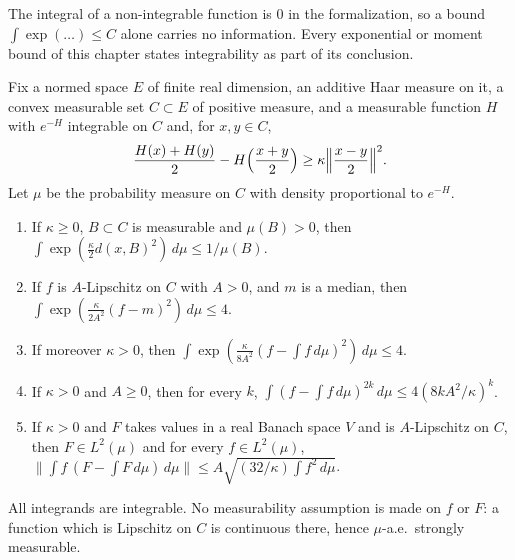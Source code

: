 \begin{remark}\label{rem:sg-tal:st-integrability}
The integral of a non-integrable function is $0$ in the formalization, so a bound
$\int\exp(\ldots)\le C$ alone carries no information. Every exponential or moment bound of this chapter
states integrability as part of its conclusion.
\end{remark}

\begin{theorem}\label{thm:sg-tal:st-maurey}
  \leanok
Fix a normed space $E$ of finite real dimension, an additive Haar measure on it, a convex measurable
set $C\subset E$ of positive measure, and a measurable function $H$ with $e^{-H}$ integrable on $C$ and, for $x,y\in C$,
\[
\frac{H(x)+H(y)}2-H\Bigl(\frac{x+y}2\Bigr)\ge\kappa\Bigl\|\frac{x-y}2\Bigr\|^2 .
\]
Let $\mu$ be the probability measure on $C$ with density proportional to $e^{-H}$.
\begin{enumerate}
\item If $\kappa\ge0$, $B\subset C$ is measurable and $\mu(B)>0$, then
$\int\exp(\frac\kappa2d(x,B)^2)\,d\mu\le1/\mu(B)$.
\item If $f$ is $A$-Lipschitz on $C$ with $A>0$, and $m$ is a median, then
$\int\exp(\frac{\kappa}{2A^2}(f-m)^2)\,d\mu\le4$.
\item If moreover $\kappa>0$, then
$\int\exp(\frac{\kappa}{8A^2}(f-\int f\,d\mu)^2)\,d\mu\le4$.
\item If $\kappa>0$ and $A\ge0$, then for every $k$,
$\int(f-\int f\,d\mu)^{2k}\,d\mu\le4(8kA^2/\kappa)^k$.
\item If $\kappa>0$ and $F$ takes values in a real Banach space $V$ and is
$A$-Lipschitz on $C$, then $F\in L^2(\mu)$ and for every $f\in L^2(\mu)$,
$\|\int f\,(F-\int F\,d\mu)\,d\mu\|\le A\sqrt{(32/\kappa)\int f^2\,d\mu}$.
\end{enumerate}
All integrands are integrable. No measurability assumption is made on $f$ or $F$: a function which is
Lipschitz on $C$ is continuous there, hence $\mu$-a.e.\ strongly measurable.
\end{theorem}
